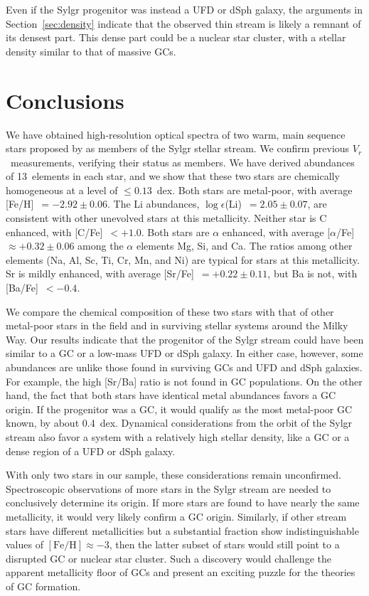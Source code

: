 \documentclass[twocolumn,tighten]{aastex62}
\newcommand{\feh}{{\mathrm{[Fe/H]}}}
\newcommand{\rv}{$V_{r}$}
\begin{document}
Even if the Sylgr progenitor was instead a UFD or dSph galaxy,
the arguments in Section~\ref{sec:density} indicate that 
the observed thin stream is likely a remnant of its densest part. 
This dense part could be a nuclear star cluster, 
with a stellar density similar to that of massive GCs.


\section{Conclusions}
\label{conclusions}


We have obtained high-resolution optical spectra of
two warm, main sequence stars 
proposed by  as members of the
Sylgr stellar stream.
We confirm previous \rv\ measurements,
verifying their status as members.
We have derived abundances of 13~elements in each star,
and we show that these two stars are chemically homogeneous
at a level of $\leq 0.13$~dex.
Both stars are metal-poor, with average
[Fe/H]~$= -2.92 \pm 0.06$.
The Li abundances,
$\log\epsilon$(Li)~$= 2.05 \pm 0.07$,
are consistent with other unevolved
stars at this metallicity.
Neither star is C enhanced, with
[C/Fe]~$< +1.0$.
Both stars are $\alpha$ enhanced, with average
[$\alpha$/Fe]~$\approx +0.32 \pm 0.06$
among the $\alpha$ elements Mg, Si, and Ca.
The ratios among other elements
(Na, Al, Sc, Ti, Cr, Mn, and Ni) are typical
for stars at this metallicity.
Sr is mildly enhanced, with average
[Sr/Fe]~$= +0.22 \pm 0.11$,
but Ba is not, with 
[Ba/Fe]~$< -0.4$.

We compare the chemical composition of these two stars with
that of other metal-poor stars in the field and in
surviving stellar systems around the Milky Way.
Our results indicate that 
the progenitor of the Sylgr stream could have been
similar to a GC or 
a low-mass UFD or dSph galaxy.
In either case, however, some abundances
are unlike those found in surviving GCs and UFD and dSph galaxies.
For example, the high [Sr/Ba] ratio 
is not found in GC populations.
On the other hand,
the fact that both stars have 
identical metal abundances
favors a GC origin.
If the progenitor was a GC, it would qualify as the 
most metal-poor GC known, by about 0.4~dex.
Dynamical considerations from the orbit of the Sylgr stream
also favor a system with a relatively high stellar density,
like a GC or a dense region of a UFD or dSph galaxy.

With only two stars in our sample, these considerations remain unconfirmed. Spectroscopic observations of more stars in the Sylgr stream are needed to conclusively determine its origin. If more stars are found to have nearly the same metallicity, it would very likely confirm a GC origin. Similarly, if other stream stars have different metallicities but a substantial fraction show indistinguishable values of $\feh \approx -3$, then the latter subset of stars would still point to a disrupted GC or nuclear star cluster. Such a discovery would challenge the apparent metallicity floor of GCs and present an exciting puzzle for the theories of GC formation.
\end{document}
